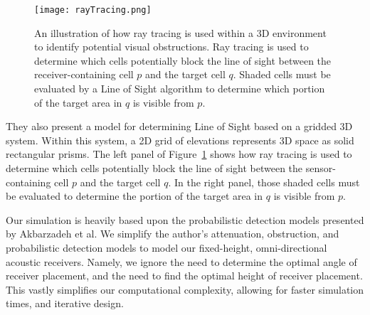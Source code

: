 \begin{figure}[ht]
	\centering
	\texttt{[image: rayTracing.png]}
	\caption{An illustration of how ray tracing is used within a 3D environment to identify potential visual obstructions.  Ray tracing is used to determine which cells potentially block the line of sight between the receiver-containing cell $p$ and the target cell $q$.  Shaded cells must be evaluated by a Line of Sight algorithm to determine which portion of the target area in $q$ is visible from $p$. \cite{Akbarzadeh2013}\label{rayTracingImg1}}
\end{figure}

They also present a model for determining Line of Sight based on a gridded 3D system.  Within this system, a 2D grid of elevations represents 3D space as solid rectangular prisms.  The left panel of Figure~\ref{rayTracingImg1} shows how ray tracing is used to determine which cells potentially block the line of sight between the sensor-containing cell $p$ and the target cell $q$.  In the right panel, those shaded cells must be evaluated to determine the portion of the target area in $q$ is visible from $p$.

Our simulation is heavily based upon the probabilistic detection models presented by Akbarzadeh et al.  We simplify the author's attenuation, obstruction, and probabilistic detection models to model our fixed-height, omni-directional acoustic receivers.  Namely, we ignore the need to determine the optimal angle of receiver placement, and the need to find the optimal height of receiver placement.  This vastly simplifies our computational complexity, allowing for faster simulation times, and iterative design.


